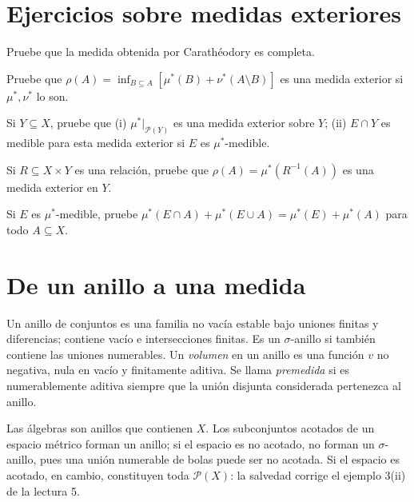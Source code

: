 \section{Ejercicios sobre medidas exteriores}
\begin{ejercicio}\label{ej:v2-l04-1}
Pruebe que la medida obtenida por Carathéodory es completa.
\end{ejercicio}

\begin{ejercicio}\label{ej:v2-l04-2}
Pruebe que $\rho(A)=\inf_{B\subseteq A}[\mu^*(B)+\nu^*(A\setminus B)]$ es una medida exterior si $\mu^*,\nu^*$ lo son.
\end{ejercicio}

\begin{ejercicio}\label{ej:v2-l04-3}
Si $Y\subseteq X$, pruebe que (i) $\mu^*|_{\mathcal P(Y)}$ es una medida exterior sobre $Y$; (ii) $E\cap Y$ es medible para esta medida exterior si $E$ es $\mu^*$-medible.
\end{ejercicio}

\begin{ejercicio}\label{ej:v2-l04-4}
Si $R\subseteq X\times Y$ es una relación, pruebe que $\rho(A)=\mu^*(R^{-1}(A))$ es una medida exterior en $Y$.
\end{ejercicio}

\begin{ejercicio}\label{ej:v2-l04-5}
Si $E$ es $\mu^*$-medible, pruebe $\mu^*(E\cap A)+\mu^*(E\cup A)=\mu^*(E)+\mu^*(A)$ para todo $A\subseteq X$.
\end{ejercicio}


\section{De un anillo a una medida}\label{lectura:v2-05}
\begin{definicion}
Un anillo de conjuntos es una familia no vacía estable bajo uniones finitas y diferencias; contiene vacío e intersecciones finitas. Es un $\sigma$-anillo si también contiene las uniones numerables. Un \emph{volumen} en un anillo es una función $v$ no negativa, nula en vacío y finitamente aditiva. Se llama \emph{premedida} si es numerablemente aditiva siempre que la unión disjunta considerada pertenezca al anillo.
\end{definicion}
Las álgebras son anillos que contienen $X$. Los subconjuntos acotados de un espacio métrico forman un anillo; si el espacio es no acotado, no forman un $\sigma$-anillo, pues una unión numerable de bolas puede ser no acotada. Si el espacio es acotado, en cambio, constituyen toda $\mathcal P(X)$: la salvedad corrige el ejemplo 3(ii) de la lectura 5.

